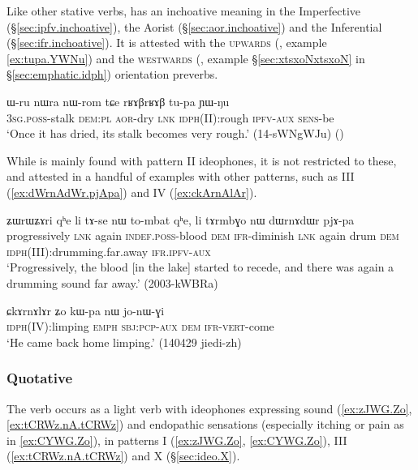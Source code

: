 
Like other stative verbs,  has an inchoative meaning in the Imperfective (§\ref{sec:ipfv.inchoative}), the Aorist (§\ref{sec:aor.inchoative}) and the Inferential (§\ref{sec:ifr.inchoative}). It is attested with the \textsc{upwards} (, example \ref{ex:tupa.YWNu}) and the \textsc{westwards} (, example §\ref{sec:xtsxoNxtsxoN} in §\ref{sec:emphatic.idph}) orientation preverbs.


\begin{exe}
\ex \label{ex:tupa.YWNu}
\gll ɯ-ru nɯra nɯ-rom tɕe rʁɤβrʁɤβ tu-pa ɲɯ-ŋu  \\
\textsc{3sg}.\textsc{poss}-stalk \textsc{dem}:\textsc{pl} \textsc{aor}-dry \textsc{lnk} \textsc{idph}(II):rough \textsc{ipfv}-\textsc{aux} \textsc{sens}-be \\
\glt `Once it has dried, its stalk becomes very rough.' (14-sWNgWJu)
()
\end{exe}

While  is mainly found with pattern II ideophones, it is not restricted to these, and attested in a handful of examples with other patterns, such as III (\ref{ex:dWrnAdWr.pjApa}) and IV (\ref{ex:ckArnAlAr}).

\begin{exe}
\ex \label{ex:dWrnAdWr.pjApa}
\gll ʑɯrɯʑɤri qʰe li tɤ-se nɯ to-mbat qʰe, li tɤrmbɣo nɯ dɯrnɤdɯr pjɤ-pa \\
progressively \textsc{lnk} again \textsc{indef}.\textsc{poss}-blood \textsc{dem} \textsc{ifr}-diminish \textsc{lnk} again drum \textsc{dem} \textsc{idph}(III):drumming.far.away \textsc{ifr}.\textsc{ipfv}-\textsc{aux} \\
\glt `Progressively, the blood [in the lake] started to recede, and there was again a drumming sound far away.' (2003-kWBRa)
\end{exe}


\begin{exe}
\ex \label{ex:ckArnAlAr}
\gll ɕkɤrnɤlɤr ʑo kɯ-pa nɯ jo-nɯ-ɣi \\
\textsc{idph}(IV):limping \textsc{emph} \textsc{sbj}:\textsc{pcp}-\textsc{aux} \textsc{dem} \textsc{ifr}-\textsc{vert}-come \\
\glt `He came back home limping.' (140429 jiedi-zh)
\end{exe}

\subsubsection{Quotative }\label{sec:idph.ti}
The verb  occurs as a light verb with ideophones expressing sound (\ref{ex:zJWG.Zo}, \ref{ex:tCRWz.nA.tCRWz}) and endopathic sensations (especially itching or pain as in \ref{ex:CYWG.Zo}), in patterns I (\ref{ex:zJWG.Zo}, \ref{ex:CYWG.Zo}), III (\ref{ex:tCRWz.nA.tCRWz}) and X (§\ref{sec:ideo.X}).

